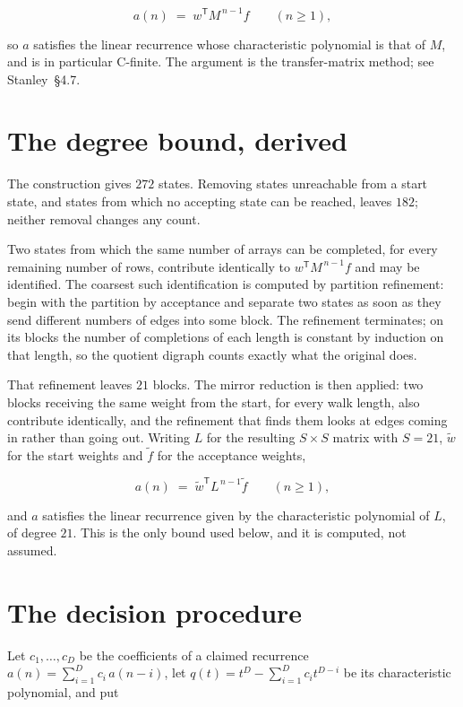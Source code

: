 \documentclass[11pt]{article}
\theoremstyle{definition}
\begin{document}
\[a(n) \;=\; w^{\mathsf T} M^{\,n-1} f \qquad (n \ge 1),\]

so $a$ satisfies the linear recurrence whose characteristic polynomial is that of $M$, and is in particular C-finite. The argument is the transfer-matrix method; see Stanley~\S4.7.

\section{The degree bound, derived}

The construction gives $272$ states. Removing states unreachable from a start state, and states from which no accepting state can be reached, leaves $182$; neither removal changes any count.

Two states from which the same number of arrays can be completed, for every remaining number of rows, contribute identically to $w^{\mathsf T}M^{\,n-1}f$ and may be identified. The coarsest such identification is computed by partition refinement: begin with the partition by acceptance and separate two states as soon as they send different numbers of edges into some block. The refinement terminates; on its blocks the number of completions of each length is constant by induction on that length, so the quotient digraph counts exactly what the original does.

That refinement leaves $21$ blocks. The mirror reduction is then applied: two blocks receiving the same weight from the start, for every walk length, also contribute identically, and the refinement that finds them looks at edges coming in rather than going out. Writing $L$ for the resulting $S \times S$ matrix with $S = 21$, $\tilde w$ for the start weights and $\tilde f$ for the acceptance weights,

\[a(n) \;=\; \tilde w^{\mathsf T} L^{\,n-1} \tilde f \qquad (n \ge 1),\]

and $a$ satisfies the linear recurrence given by the characteristic polynomial of $L$, of degree $21$. This is the only bound used below, and it is computed, not assumed.

\section{The decision procedure}

Let $c_1,\dots,c_D$ be the coefficients of a claimed recurrence $a(n) = \sum_{i=1}^{D} c_i\,a(n-i)$, let $q(t) = t^{D} - \sum_{i=1}^{D} c_i t^{D-i}$ be its characteristic polynomial, and put
\end{document}
